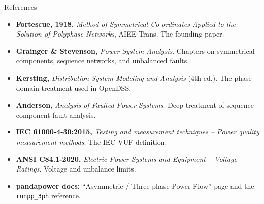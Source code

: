 \documentclass[aspectratio=169,10pt]{beamer}
\newcommand{\code}[1]{\texttt{#1}}
\begin{document}
\begin{frame}{References}
\footnotesize
\begin{itemize}
  \item \textbf{Fortescue, 1918.} \emph{Method of Symmetrical Co-ordinates Applied to the Solution of Polyphase Networks}, AIEE Trans. The founding paper.
  \item \textbf{Grainger \& Stevenson,} \emph{Power System Analysis}. Chapters on symmetrical components, sequence networks, and unbalanced faults.
  \item \textbf{Kersting,} \emph{Distribution System Modeling and Analysis} (4th ed.). The phase-domain treatment used in OpenDSS.
  \item \textbf{Anderson,} \emph{Analysis of Faulted Power Systems}. Deep treatment of sequence-component fault analysis.
  \item \textbf{IEC 61000-4-30:2015,} \emph{Testing and measurement techniques -- Power quality measurement methods}. The IEC VUF definition.
  \item \textbf{ANSI C84.1-2020,} \emph{Electric Power Systems and Equipment -- Voltage Ratings}. Voltage and unbalance limits.
  \item \textbf{pandapower docs:} ``Asymmetric / Three-phase Power Flow'' page and the \code{runpp\_3ph} reference.
\end{itemize}
\end{frame}
\end{document}
